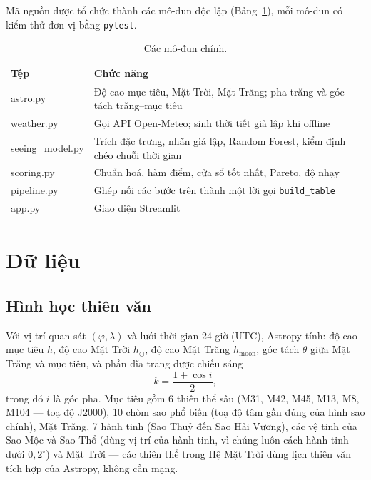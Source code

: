 \documentclass[12pt,a4paper]{article}
\begin{document}
Mã nguồn được tổ chức thành các mô-đun độc lập (Bảng~\ref{tab:modules}), mỗi mô-đun có
kiểm thử đơn vị bằng \texttt{pytest}.

\begin{table}[h]
\centering
\begin{tabularx}{\textwidth}{>{\ttfamily}l X}
\toprule
\normalfont\textbf{Tệp} & \textbf{Chức năng} \\
\midrule
astro.py        & Độ cao mục tiêu, Mặt Trời, Mặt Trăng; pha trăng và góc tách trăng--mục tiêu \\
weather.py      & Gọi API Open-Meteo; sinh thời tiết giả lập khi offline \\
seeing\_model.py & Trích đặc trưng, nhãn giả lập, Random Forest, kiểm định chéo chuỗi thời gian \\
scoring.py      & Chuẩn hoá, hàm điểm, cửa sổ tốt nhất, Pareto, độ nhạy \\
pipeline.py     & Ghép nối các bước trên thành một lời gọi \texttt{build\_table} \\
app.py          & Giao diện Streamlit \\
\bottomrule
\end{tabularx}
\caption{Các mô-đun chính.}
\label{tab:modules}
\end{table}

\section{Dữ liệu}

\subsection{Hình học thiên văn}
Với vị trí quan sát $(\varphi,\lambda)$ và lưới thời gian 24 giờ (UTC), Astropy tính:
độ cao mục tiêu $h$, độ cao Mặt Trời $h_\odot$, độ cao Mặt Trăng $h_{\text{moon}}$, góc tách
$\theta$ giữa Mặt Trăng và mục tiêu, và phần đĩa trăng được chiếu sáng
\begin{equation}
k = \frac{1+\cos i}{2},
\end{equation}
trong đó $i$ là góc pha. Mục tiêu gồm 6 thiên thể sâu (M31, M42, M45, M13, M8, M104 --- toạ độ
J2000), 10 chòm sao phổ biến (toạ độ tâm gần đúng của hình sao chính), Mặt Trăng, 7 hành tinh
(Sao Thuỷ đến Sao Hải Vương), các vệ tinh của Sao Mộc và Sao Thổ (dùng vị trí của hành tinh, vì
chúng luôn cách hành tinh dưới $0{,}2^\circ$) và Mặt Trời --- các thiên thể trong Hệ Mặt Trời dùng
lịch thiên văn tích hợp của Astropy, không cần mạng.
\end{document}
